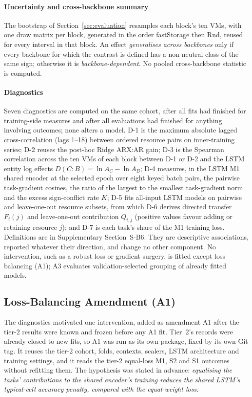 \documentclass[5p,twocolumn]{elsarticle}
\begin{document}
\paragraph{Uncertainty and cross-backbone summary} The bootstrap of
Section~\ref{sec:evaluation} resamples each block's ten VMs, with one draw
matrix per block, generated in the order fastStorage then Rnd, reused for
every interval in that block. An effect \emph{generalises across backbones} only
if every backbone for which the contrast is defined has a non-neutral class
of the same sign; otherwise it is \emph{backbone-dependent}. No pooled
cross-backbone statistic is computed.

\paragraph{Diagnostics} Seven diagnostics are computed on the same cohort,
after all fits had finished for training-side measures and after all
evaluations had finished for anything involving outcomes; none alters a model.
D-1 is the maximum absolute lagged cross-correlation (lags 1--18) between
ordered resource pairs on inner-training series; D-2 reuses the post-hoc Ridge
ARX:AR gain; D-3 is the Spearman correlation across the ten VMs of each block
between D-1 or D-2 and the LSTM entity log effects
$D(C\!:\!B)=\ln A_C-\ln A_B$; D-4 measures, in the LSTM M1 shared encoder at
the selected epoch over eight keyed batch pairs, the pairwise task-gradient
cosines, the ratio of the largest to the smallest task-gradient norm and the
excess sign-conflict rate $K$; D-5 fits all-input LSTM models on pairwise and
leave-one-out resource subsets, from which D-6 derives directed transfer
$F_i(j)$ and leave-one-out contribution $Q_{i,j}$ (positive values favour
adding or retaining resource $j$); and D-7 is each task's share of the M1
training loss. Definitions are in Supplementary Section~S-B6.
They are descriptive associations, reported whatever their direction, and
change no other component. No intervention, such as a
robust loss or gradient surgery, is fitted except loss balancing (A1); A3
evaluates validation-selected grouping of already fitted models.

\subsection{Loss-Balancing Amendment (A1)}
\label{sec:a1-design}

The diagnostics motivated one intervention, added as amendment A1 after the
tier-2 results were known and frozen before any A1 fit. Tier~2's records were
already closed to new fits, so A1 was run as its own package, fixed by its own
Git tag. It reuses the tier-2
cohort, folds, contexts, scalers, LSTM architecture and training settings,
and it reads the tier-2 equal-loss M1, S2 and S1 outcomes without refitting
them. The hypothesis was stated in advance: \emph{equalising the tasks'
contributions to the shared encoder's training reduces the shared LSTM's
typical-cell accuracy penalty, compared with the equal-weight loss.}
\end{document}
